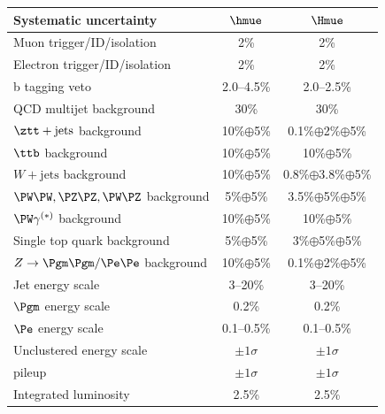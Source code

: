\begin{table}[htpb]
\begin{center}
\begin{tabular}{l*{2}{c}} \hline
Systematic  uncertainty            & $\hmue$& $\Hmue$  \\ \hline
Muon  trigger/ID/isolation         &          2\%           &        2\%         \\
Electron trigger/ID/isolation      &          2\%           &        2\%           \\
b tagging veto                     &      2.0--4.5\%        &      2.0--2.5\%         \\ 
[\cmsTabSkip]
QCD multijet background            &          30\%          &        30\%                \\
$\ztt+\textrm{jets}$ background    &    10\%$\oplus$5\%     & 0.1\%$\oplus$2\%$\oplus$5\%         \\
$\ttb$ background                  &    10\%$\oplus$5\%     &   10\%$\oplus$5\%              \\
$W+\textrm{jets}$ background       &    10\%$\oplus$5\%     & 0.8\%$\oplus$3.8\%$\oplus$5\%        \\
$\PW\PW,\PZ\PZ,\PW\PZ$ background  &    5\%$\oplus$5\%      &  3.5\%$\oplus$5\%$\oplus$5\%       \\
$\PW\gamma^{(*)}$ background       &    10\%$\oplus$5\%     &  10\%$\oplus$5\%       \\
Single top quark background        &    5\%$\oplus$5\%      & 3\%$\oplus$5\%$\oplus$5\%    \\ 
$Z\to\Pgm\Pgm/\Pe\Pe$ background   &    10\%$\oplus$5\%     & 0.1\%$\oplus$2\%$\oplus$5\%     \\
[\cmsTabSkip]
Jet energy scale                   &        3--20\%         &        3--20\%                         \\
$\Pgm$ energy scale                &        0.2\%           &        0.2\%                              \\
 $\Pe$ energy scale                &        0.1--0.5\%      &        0.1--0.5\%                          \\
Unclustered energy scale           &        $\pm 1 \sigma$  &     $\pm 1 \sigma$                            \\
pileup                             &        $\pm 1 \sigma$  &     $\pm 1 \sigma$                            \\
[\cmsTabSkip]
Integrated luminosity              &         2.5\%          &       2.5\%                                        \\ \hline
\end{tabular}
\label{table:syst}
\end{center}
\end{table}


